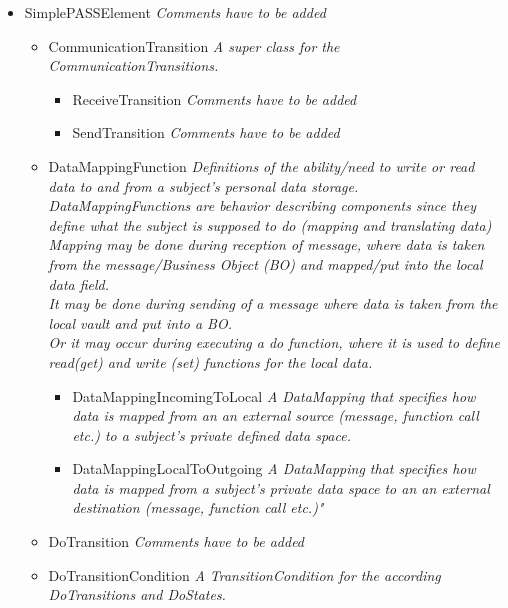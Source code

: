 \begin{itemize}
\item SimplePASSElement \linebreak \textit{Comments have to be added}
\begin{itemize}
	\item CommunicationTransition \linebreak \textit{A super class for the CommunicationTransitions.}
	\begin{itemize}
		\item ReceiveTransition \linebreak \textit{Comments have to be added}
		\item SendTransition \linebreak \textit{Comments have to be added}
	\end{itemize}
	\item DataMappingFunction \linebreak \textit{Definitions of the ability/need to write or read data to and from a subject's personal data storage.\\
	DataMappingFunctions are behavior describing components since they define what the subject is supposed to do (mapping and translating data)\\
	Mapping may be done during reception of message, where data is taken from the message/Business Object (BO) and mapped/put into the local data field.\\
	It may be done during sending of a message where data is taken from the local vault and put into a BO.\\
	Or it may occur during executing a do function, where it is used to define read(get) and write (set) functions for the local data.}
	\begin{itemize}
		\item DataMappingIncomingToLocal \linebreak \textit{A DataMapping that specifies how data is mapped from an an external source (message, function call etc.) to a subject's private defined data space.}
		\item DataMappingLocalToOutgoing \linebreak \textit{A DataMapping that specifies how data is mapped from a subject's private data space to an an external destination (message, function call etc.)" }
	\end{itemize}
	\item DoTransition \linebreak \textit{Comments have to be added}
	\item DoTransitionCondition \linebreak \textit{A TransitionCondition for the according DoTransitions and DoStates.}

\end{itemize}
\end{itemize}
